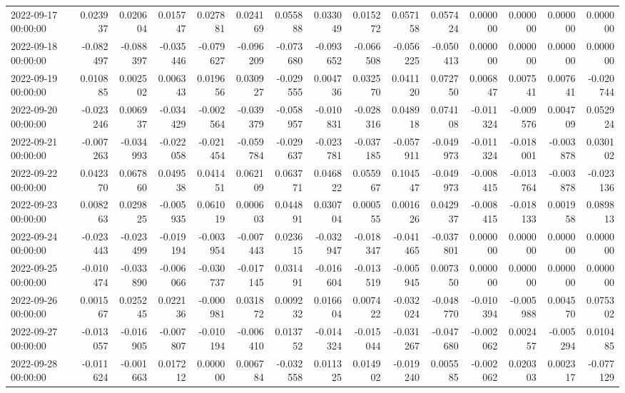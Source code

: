 \begin{tabular}{lrrrrrrrrrrrrrr}
2022-09-17 00:00:00 & 0.023937 & 0.020604 & 0.015747 & 0.027881 & 0.024169 & 0.055888 & 0.033049 & 0.015272 & 0.057158 & 0.057424 & 0.000000 & 0.000000 & 0.000000 & 0.000000 \\
2022-09-18 00:00:00 & -0.082497 & -0.088397 & -0.035446 & -0.079627 & -0.096209 & -0.073680 & -0.093652 & -0.066508 & -0.056225 & -0.050413 & 0.000000 & 0.000000 & 0.000000 & 0.000000 \\
2022-09-19 00:00:00 & 0.010885 & 0.002502 & 0.006343 & 0.019656 & 0.030927 & -0.029555 & 0.004736 & 0.032570 & 0.041120 & 0.072750 & 0.006847 & 0.007541 & 0.007641 & -0.020744 \\
2022-09-20 00:00:00 & -0.023246 & 0.006937 & -0.034429 & -0.002564 & -0.039379 & -0.058957 & -0.010831 & -0.028316 & 0.048918 & 0.074108 & -0.011324 & -0.009576 & 0.004709 & 0.052924 \\
2022-09-21 00:00:00 & -0.007263 & -0.034993 & -0.022058 & -0.021454 & -0.059784 & -0.029637 & -0.023781 & -0.037185 & -0.057911 & -0.049973 & -0.011324 & -0.018001 & -0.003878 & 0.030102 \\
2022-09-22 00:00:00 & 0.042370 & 0.067860 & 0.049538 & 0.041451 & 0.062109 & 0.063771 & 0.046822 & 0.055967 & 0.104547 & -0.049973 & -0.008415 & -0.013764 & -0.003878 & -0.023136 \\
2022-09-23 00:00:00 & 0.008263 & 0.029825 & -0.005935 & 0.061019 & 0.000603 & 0.044891 & 0.030704 & 0.000555 & 0.001626 & 0.042937 & -0.008415 & -0.018133 & 0.001958 & 0.089813 \\
2022-09-24 00:00:00 & -0.023443 & -0.023499 & -0.019194 & -0.003954 & -0.007443 & 0.023615 & -0.032947 & -0.018347 & -0.041465 & -0.037801 & 0.000000 & 0.000000 & 0.000000 & 0.000000 \\
2022-09-25 00:00:00 & -0.010474 & -0.033890 & -0.006066 & -0.030737 & -0.017145 & 0.031491 & -0.016604 & -0.013519 & -0.005945 & 0.007350 & 0.000000 & 0.000000 & 0.000000 & 0.000000 \\
2022-09-26 00:00:00 & 0.001567 & 0.025245 & 0.022136 & -0.000981 & 0.031872 & 0.009232 & 0.016604 & 0.007422 & -0.032024 & -0.048770 & -0.010394 & -0.005988 & 0.004570 & 0.075302 \\
2022-09-27 00:00:00 & -0.013057 & -0.016905 & -0.007807 & -0.010194 & -0.006410 & 0.013752 & -0.014324 & -0.015044 & -0.031267 & -0.047680 & -0.002062 & 0.002457 & -0.005294 & 0.010485 \\
2022-09-28 00:00:00 & -0.011624 & -0.001663 & 0.017212 & 0.000000 & 0.006784 & -0.032558 & 0.011325 & 0.014902 & -0.019240 & 0.005585 & -0.002062 & 0.020303 & 0.002317 & -0.077129 \\

\end{tabular}
